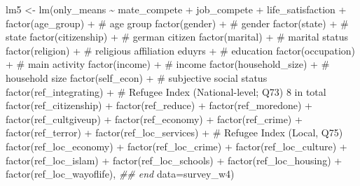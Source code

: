\documentclass[
]{article}
\newenvironment{Shaded}{\begin{snugshade}}{\end{snugshade}}
\newcommand{\AttributeTok}[1]{\textcolor[rgb]{0.40,0.45,0.13}{#1}}
\newcommand{\CommentTok}[1]{\textcolor[rgb]{0.37,0.37,0.37}{#1}}
\newcommand{\DocumentationTok}[1]{\textcolor[rgb]{0.37,0.37,0.37}{\textit{#1}}}
\newcommand{\FunctionTok}[1]{\textcolor[rgb]{0.28,0.35,0.67}{#1}}
\newcommand{\NormalTok}[1]{\textcolor[rgb]{0.00,0.23,0.31}{#1}}
\newcommand{\OtherTok}[1]{\textcolor[rgb]{0.00,0.23,0.31}{#1}}
\newcommand{\SpecialCharTok}[1]{\textcolor[rgb]{0.37,0.37,0.37}{#1}}
\begin{document}
\begin{Shaded}
\begin{Highlighting}[]
\NormalTok{lm5 }\OtherTok{\textless{}{-}} \FunctionTok{lm}\NormalTok{(only\_means }\SpecialCharTok{\textasciitilde{}}\NormalTok{ mate\_compete }\SpecialCharTok{+}\NormalTok{ job\_compete }\SpecialCharTok{+}\NormalTok{ life\_satisfaction }\SpecialCharTok{+} 
            \FunctionTok{factor}\NormalTok{(age\_group) }\SpecialCharTok{+}      \CommentTok{\# age group}
            \FunctionTok{factor}\NormalTok{(gender) }\SpecialCharTok{+}      \CommentTok{\# gender }
            \FunctionTok{factor}\NormalTok{(state) }\SpecialCharTok{+}      \CommentTok{\# state  }
            \FunctionTok{factor}\NormalTok{(citizenship) }\SpecialCharTok{+}     \CommentTok{\# german citizen}
            \FunctionTok{factor}\NormalTok{(marital) }\SpecialCharTok{+}     \CommentTok{\# marital status}
            \FunctionTok{factor}\NormalTok{(religion) }\SpecialCharTok{+}     \CommentTok{\# religious affiliation}
\NormalTok{            eduyrs }\SpecialCharTok{+} \CommentTok{\# education}
            \FunctionTok{factor}\NormalTok{(occupation) }\SpecialCharTok{+}     \CommentTok{\# main activity}
            \FunctionTok{factor}\NormalTok{(income) }\SpecialCharTok{+}    \CommentTok{\# income}
            \FunctionTok{factor}\NormalTok{(household\_size) }\SpecialCharTok{+}    \CommentTok{\# household size}
            \FunctionTok{factor}\NormalTok{(self\_econ) }\SpecialCharTok{+}    \CommentTok{\# subjective social status}
            \FunctionTok{factor}\NormalTok{(ref\_integrating) }\SpecialCharTok{+} \CommentTok{\# Refugee Index (National{-}level; Q73) 8 in total}
            \FunctionTok{factor}\NormalTok{(ref\_citizenship) }\SpecialCharTok{+} \FunctionTok{factor}\NormalTok{(ref\_reduce) }\SpecialCharTok{+} \FunctionTok{factor}\NormalTok{(ref\_moredone) }\SpecialCharTok{+} \FunctionTok{factor}\NormalTok{(ref\_cultgiveup) }\SpecialCharTok{+} 
            \FunctionTok{factor}\NormalTok{(ref\_economy) }\SpecialCharTok{+} \FunctionTok{factor}\NormalTok{(ref\_crime) }\SpecialCharTok{+} \FunctionTok{factor}\NormalTok{(ref\_terror) }\SpecialCharTok{+} 
            \FunctionTok{factor}\NormalTok{(ref\_loc\_services) }\SpecialCharTok{+}    \CommentTok{\# Refugee Index (Local, Q75)}
            \FunctionTok{factor}\NormalTok{(ref\_loc\_economy) }\SpecialCharTok{+} \FunctionTok{factor}\NormalTok{(ref\_loc\_crime) }\SpecialCharTok{+} \FunctionTok{factor}\NormalTok{(ref\_loc\_culture) }\SpecialCharTok{+} \FunctionTok{factor}\NormalTok{(ref\_loc\_islam) }\SpecialCharTok{+} 
            \FunctionTok{factor}\NormalTok{(ref\_loc\_schools) }\SpecialCharTok{+} \FunctionTok{factor}\NormalTok{(ref\_loc\_housing) }\SpecialCharTok{+} \FunctionTok{factor}\NormalTok{(ref\_loc\_wayoflife), }\DocumentationTok{\#\# end}
          \AttributeTok{data=}\NormalTok{survey\_w4)}



\end{Highlighting}
\end{Shaded}
\end{document}
